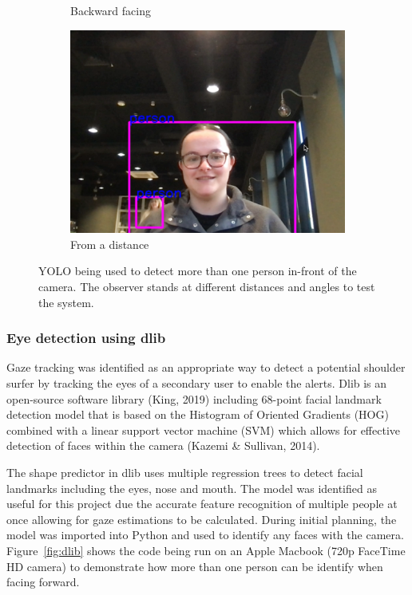 \documentclass[12pt]{article}
\theoremstyle{plain}
\theoremstyle{definition}
\begin{document}
\begin{figure}
\begin{subfigure}[b]{0.3\textwidth}
         \caption{Backward facing}
         \label{fig:b}
     \end{subfigure}
     \hfill
     \begin{subfigure}[b]{0.3\textwidth}
         \centering
         \includegraphics[width=\textwidth]{img/fig1-img3.png}
         \caption{From a distance}
         \label{fig:c}
     \end{subfigure}
        \caption{YOLO being used to detect more than one person in-front of the camera. The observer stands at different distances and angles to test the system.}
        \label{fig:yolo}
\end{figure}



\subsubsection{Eye detection using dlib}

Gaze tracking was identified as an appropriate way to detect a potential shoulder surfer by tracking the eyes of a secondary user to enable the alerts. Dlib is an open-source software library (King, 2019) including 68-point facial landmark detection model that is based on the Histogram of Oriented Gradients (HOG) combined with a linear support vector machine (SVM) which allows for effective detection of faces within the camera (Kazemi & Sullivan, 2014).

The shape predictor in dlib uses multiple regression trees to detect facial landmarks including the eyes, nose and mouth. The model was identified as useful for this project due the accurate feature recognition of multiple people at once allowing for gaze estimations to be calculated.
During initial planning, the model was imported into Python and used to identify any faces with the camera. Figure~\ref{fig:dlib} shows the code being run on an Apple Macbook (720p FaceTime HD camera) to demonstrate how more than one person can be identify when facing forward.
\end{document}
